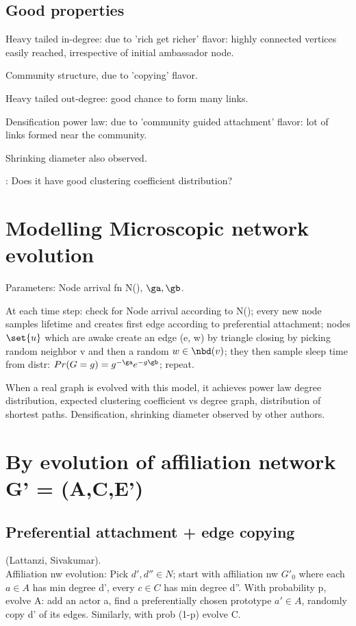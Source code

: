 \documentclass[oneside, article]{memoir}
\begin{document}
\subsection{Good properties}
Heavy tailed in-degree: due to 'rich get richer' flavor: highly connected vertices easily reached, irrespective of initial ambassador node.

Community structure, due to 'copying' flavor.

Heavy tailed out-degree: good chance to form many links.

Densification power law: due to 'community guided attachment' flavor: lot of links formed near the community.

Shrinking diameter also observed.

\oprob: Does it have good clustering coefficient distribution?

\section{Modelling Microscopic network evolution}
Parameters: Node arrival fn N(), $\ga, \gb$.

At each time step: check for Node arrival according to N(); every new node samples lifetime and creates first edge according to preferential attachment; nodes $\set{u}$ which are awake create an edge (e, w) by triangle closing by picking random neighbor v and then a random $w \in \nbd(v)$; they then sample sleep time from distr: $Pr(G=g) = g^{-\ga}e^{-g \gb}$; repeat.

When a real graph is evolved with this model, it achieves power law degree distribution, expected clustering coefficient vs degree graph, distribution of shortest paths. Densification, shrinking diameter observed by other authors.

\section{By evolution of affiliation network G' = (A,C,E')}
\subsection{Preferential attachment + edge copying}
(Lattanzi, Sivakumar).\\
Affiliation nw evolution: Pick $d', d'' \in N$; start with affiliation nw $G'_{0}$ where each $a \in A$ has min degree d', every $c \in C$ has min degree d''. With probability p, evolve A: add an actor a, find a preferentially chosen prototype $a' \in A$, randomly copy d' of its edges. Similarly, with prob (1-p) evolve C.
\end{document}
